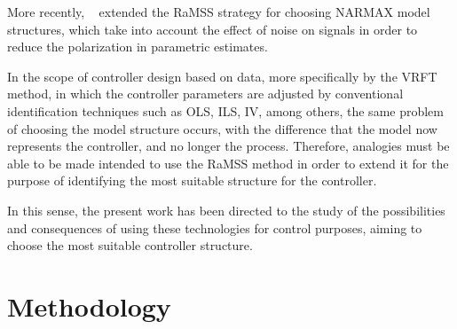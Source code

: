 %
More recently, ~\cite{retesNARMAXModelIdentification2019} extended the RaMSS strategy for choosing NARMAX model structures, which take into account the effect of noise on signals in order to reduce the polarization in parametric estimates.

In the scope of controller design based on data, more specifically by the VRFT method, in which the controller parameters are adjusted by conventional identification techniques such as OLS, ILS, IV, among others, the same problem of choosing the model structure occurs, with the difference that the model now represents the controller, and no longer the process. Therefore, analogies must be able to be made intended to use the RaMSS method in order to extend it for the purpose of identifying the most suitable structure for the controller.

In this sense, the present work has been directed to the study of the possibilities and consequences of using these technologies for control purposes, aiming to choose the most suitable controller structure.



\section{Methodology}\label{sec:CSS_metod} 

